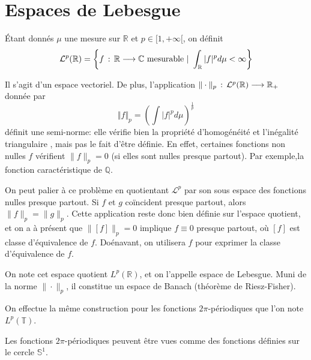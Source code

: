 	\section{Espaces de Lebesgue}
	
		\begin{mydef}
			Étant donnés $\mu$ une mesure sur $\mathbb{R}$ et $p \in [1, +\infty[$, on définit
				$$ \mathcal{L}^{p} (\mathbb{R}) = \left \{ f \, : \, \mathbb{R} \longrightarrow \mathbb{C} \text{ mesurable} ~|~ \int_{\mathbb{R}}|f|^p d\mu < \infty \right \} $$
		\end{mydef}
	
		Il s'agit d'un espace vectoriel. De plus, l'application $\| \cdot \|_p \, : \, \mathcal{L}^p(\mathbb{R}) \longrightarrow \mathbb{R}_+$ donnée par
		 $$\Vert f \Vert_p = \left( \int|f|^pd\mu \right)^{\frac{1}{p}} $$ 
		 définit une semi-norme: elle vérifie bien la propriété d'homogénéité et l'inégalité triangulaire \cite{tmi}, mais pas le fait d'être définie. En effet, certaines fonctions non nulles $f$ vérifient $\|f\|_p = 0$ (si elles sont nulles presque partout). Par exemple,la fonction caractéristique de $\mathbb{Q}$. 
		 
		 On peut palier à ce problème en quotientant $\mathcal{L}^p$ par son sous espace des fonctions nulles presque partout. Si $f$ et $g$ coïncident presque partout, alors
		 $\|f\|_p = \|g\|_p$. Cette application reste donc bien définie sur l'espace quotient, et on a à présent que $ \|[f]\|_p = 0$ implique $f \equiv 0$ presque partout, où $[f]$ est classe d'équivalence de $f$. 
		 Doénavant, on utilisera $f$ pour exprimer la classe d'équivalence de $f$.
		 
		 \begin{mydef} 
		 	On note cet espace quotient $L^p(\mathbb{R})$, et on l'appelle espace de Lebesgue. Muni de la norme $\| \cdot \|_p$, il constitue un espace de Banach (théorème de Riesz-Fisher)\cite{tmi}. 
		 \end{mydef}
		 
		On effectue la même construction pour les fonctions $2\pi$-périodiques que l'on note $L^p(\mathbb{T})$.
		
		\begin{myrem}
			Les fonctions $2\pi$-périodiques peuvent être vues comme des fonctions définies sur le cercle $\mathbb{S}^1$.
		\end{myrem}

		
	

